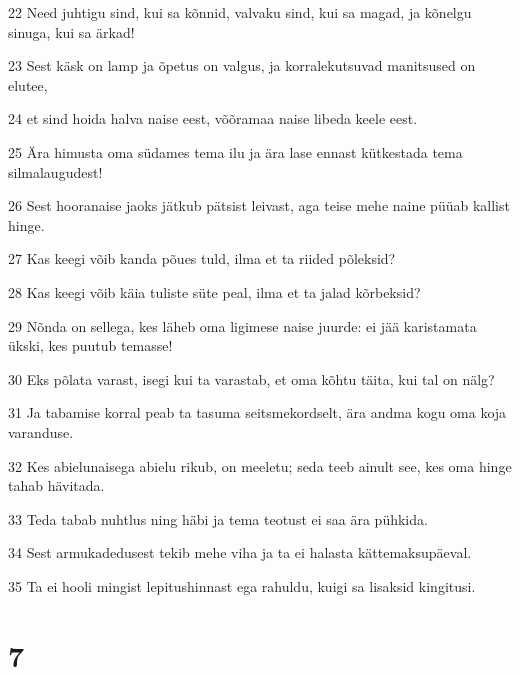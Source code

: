 \par 22 Need juhtigu sind, kui sa kõnnid, valvaku sind, kui sa magad, ja kõnelgu sinuga, kui sa ärkad!
\par 23 Sest käsk on lamp ja õpetus on valgus, ja korralekutsuvad manitsused on elutee,
\par 24 et sind hoida halva naise eest, võõramaa naise libeda keele eest.
\par 25 Ära himusta oma südames tema ilu ja ära lase ennast kütkestada tema silmalaugudest!
\par 26 Sest hooranaise jaoks jätkub pätsist leivast, aga teise mehe naine püüab kallist hinge.
\par 27 Kas keegi võib kanda põues tuld, ilma et ta riided põleksid?
\par 28 Kas keegi võib käia tuliste süte peal, ilma et ta jalad kõrbeksid?
\par 29 Nõnda on sellega, kes läheb oma ligimese naise juurde: ei jää karistamata ükski, kes puutub temasse!
\par 30 Eks põlata varast, isegi kui ta varastab, et oma kõhtu täita, kui tal on nälg?
\par 31 Ja tabamise korral peab ta tasuma seitsmekordselt, ära andma kogu oma koja varanduse.
\par 32 Kes abielunaisega abielu rikub, on meeletu; seda teeb ainult see, kes oma hinge tahab hävitada.
\par 33 Teda tabab nuhtlus ning häbi ja tema teotust ei saa ära pühkida.
\par 34 Sest armukadedusest tekib mehe viha ja ta ei halasta kättemaksupäeval.
\par 35 Ta ei hooli mingist lepitushinnast ega rahuldu, kuigi sa lisaksid kingitusi.

\chapter{7}

